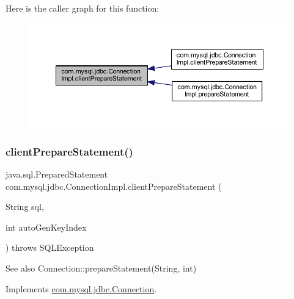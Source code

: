 Here is the caller graph for this function\+:\nopagebreak
\begin{figure}[H]
\begin{center}
\leavevmode
\includegraphics[width=350pt]{classcom_1_1mysql_1_1jdbc_1_1_connection_impl_a10c73f6da363742abd84a76ea024292d_icgraph}
\end{center}
\end{figure}
\mbox{\label{classcom_1_1mysql_1_1jdbc_1_1_connection_impl_a5ac2643cdeea74e7b46e0b7f18b980d4}} 
\subsubsection{\texorpdfstring{client\+Prepare\+Statement()}{clientPrepareStatement()}\hspace{0.1cm}{\footnotesize\ttfamily [2/6]}}
{\footnotesize\ttfamily java.\+sql.\+Prepared\+Statement com.\+mysql.\+jdbc.\+Connection\+Impl.\+client\+Prepare\+Statement (\begin{DoxyParamCaption}\item[{String}]{sql,  }\item[{int}]{auto\+Gen\+Key\+Index }\end{DoxyParamCaption}) throws S\+Q\+L\+Exception}

\begin{DoxySeeAlso}{See also}
Connection\+::prepare\+Statement(\+String, int) 
\end{DoxySeeAlso}


Implements \mbox{\hyperlink{interfacecom_1_1mysql_1_1jdbc_1_1_connection_a4942503d586cb18634b960ee276fa1bb}{com.\+mysql.\+jdbc.\+Connection}}.

